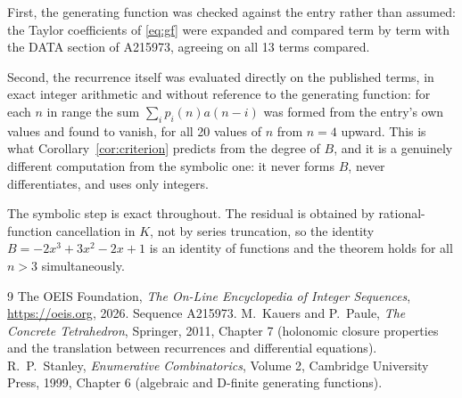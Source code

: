 \documentclass[11pt,a4paper]{article}
\theoremstyle{plain}
\theoremstyle{definition}
\begin{document}
First, the generating function was checked against the entry rather than assumed: the
Taylor coefficients of \eqref{eq:gf} were expanded and compared term by term with the DATA
section of A215973, agreeing on all 13 terms compared.

Second, the recurrence itself was evaluated directly on the published terms, in exact
integer arithmetic and without reference to the generating function: for each $n$ in range
the sum $\sum_{i}p_{i}(n)a(n-i)$ was formed from the entry's own values and found to
vanish, for all 20 values of $n$ from $n=4$ upward. This is what
Corollary~\ref{cor:criterion} predicts from the degree of $B$, and it is a genuinely
different computation from the symbolic one: it never forms $B$, never differentiates, and
uses only integers.

The symbolic step is exact throughout. The residual is obtained by rational-function
cancellation in $K$, not by series truncation, so the identity $B=- 2 x^{3} + 3 x^{2} - 2 x + 1$ is an
identity of functions and the theorem holds for all $n>3$ simultaneously.

\begin{thebibliography}{9}
 The OEIS Foundation, \emph{The On-Line Encyclopedia of Integer Sequences},
\url{https://oeis.org}, 2026. Sequence A215973.
 M.~Kauers and P.~Paule, \emph{The Concrete Tetrahedron}, Springer, 2011,
Chapter 7 (holonomic closure properties and the translation between recurrences and
differential equations).
 R.~P.~Stanley, \emph{Enumerative Combinatorics}, Volume 2, Cambridge
University Press, 1999, Chapter 6 (algebraic and D-finite generating functions).
\end{thebibliography}
\end{document}
